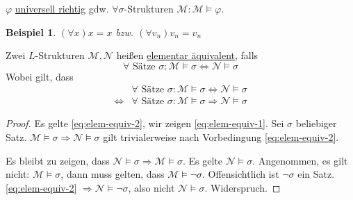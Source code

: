 \documentclass{article}
\theoremstyle{definition}
\theoremstyle{plain}
\newtheorem*{bsp}{Beispiel}
\newcommand{\m}[1]{\mathcal{#1}}
\begin{document}
    $ \varphi $ \underline{universell richtig} gdw. $ \forall \sigma$-Strukturen $ \m{M}: \m{M} \models \varphi $.
    \begin{bsp}
        $ (\forall x) x = x $ bzw. $ (\forall v_n) v_n = v_n $
    \end{bsp}

    Zwei $ L $-Strukturen $ \m{M}, \m{N} $ heißen \underline{elementar äquivalent}, falls
    \begin{equation*}
        \forall \text{ Sätze } \sigma: \m{M} \models \sigma \Leftrightarrow \m{N} \models \sigma \label{eq:elem-equiv-1}
    \end{equation*}
    Wobei gilt, dass
    \begin{align}
        & \forall \text{ Sätze } \sigma: \m{M} \models \sigma \Leftrightarrow \m{N} \models \sigma \label{eq:elem-equiv-1} \\
        \Leftrightarrow & \forall \text{ Sätze } \sigma: \m{M} \models \sigma \Rightarrow \m{N} \models \sigma \label{eq:elem-equiv-2}
    \end{align}

    \begin{proof}
        Es gelte \eqref{eq:elem-equiv-2}, wir zeigen \eqref{eq:elem-equiv-1}.
        Sei $ \sigma $ beliebiger Satz.
        $ \m{M} \models \sigma \Rightarrow \m{N} \models \sigma $
        gilt trivialerweise nach Vorbedingung \eqref{eq:elem-equiv-2}.

        Es bleibt zu zeigen, dass $ \m{N} \models \sigma \Rightarrow \m{M} \models \sigma $.
        Es gelte $ \m{N} \models \sigma $.
        Angenommen, es gilt nicht: $ \m{M} \models \sigma $, dann muss gelten, dass $ \m{M} \models \neg \sigma $.
        Offensichtlich ist $ \neg \sigma $ ein Satz.
        \eqref{eq:elem-equiv-2} $ \Rightarrow \m{N} \models \neg \sigma $, also nicht $ \m{N} \models \sigma $. Widerspruch.
    \end{proof}
\end{document}
